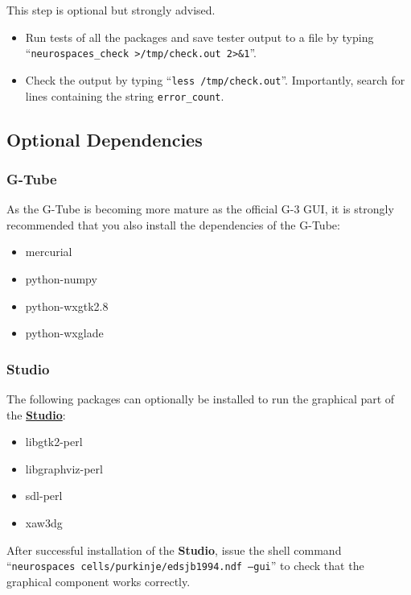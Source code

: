 \documentclass[12pt]{article}
\begin{document}
This step is optional but strongly advised.

\begin{itemize}      
   \item[] Run tests of all the packages and save tester output to a file  by typing ``{\tt neurospaces\_check >/tmp/check.out 2>\&1}''.
   \item[] Check the output by typing ``{\tt less /tmp/check.out}''. Importantly, search for lines containing the string {\tt error\_count}.
\end{itemize}
    

\subsection*{Optional Dependencies}

\subsubsection*{G-Tube}

As the G-Tube is becoming more mature as the official G-3 GUI, it is
strongly recommended that you also install the dependencies of the G-Tube:

\begin{itemize}
\item mercurial
\item python-numpy
\item python-wxgtk2.8
\item python-wxglade
\end{itemize}

\subsubsection*{Studio}

The following packages can optionally be installed to run the
graphical part of the \href{../studio/studio.tex}{\bf Studio}:
\begin{itemize}
\item libgtk2-perl
\item libgraphviz-perl
\item sdl-perl
\item xaw3dg
\end{itemize}
After successful installation of the {\bf Studio}, issue the
shell command ``{\tt neurospaces cells/purkinje/edsjb1994.ndf --gui}'' to check that 
the graphical component works correctly.
\end{document}
